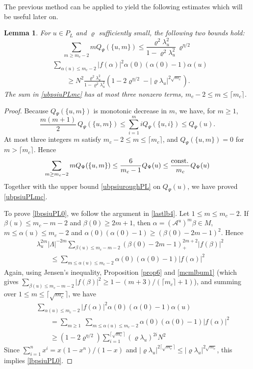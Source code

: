 \documentclass[11pt]{article}
\numberwithin{equation}{section}
\newcommand{\beq}{\begin{equation}}
\newcommand{\eeq}{\end{equation}}
\newcommand{\beqa}{\begin{eqnarray}}
\newcommand{\eeqa}{\end{eqnarray}}
\newcommand\const{{\rm const.\, }}
\newcommand\al{{\alpha}}
\newcommand\be{\beta}
\renewcommand\rho\varrho
\newtheorem{lem}{Lemma}[section]
\theoremstyle{definition}
\begin{document}
\bigskip 

 
The previous  method can be applied to yield the following estimates which will be useful later on. 
\begin{lem} For $u\in P_L$ and  $\rho$ sufficiently small, the following two bounds hold: 
\beq\label{ubpsiuPLmc}
	\sum_{m\geq m_c-2} m Q_\Psi(\{u,m\})\leq \frac{\rho^2\lambda_u^2}{1-\rho^2\lambda_u^2}\,\rho^{\eta/2}
\eeq
\beq\label{lbpsiuPL0}
\begin{split}
	&\sum_{\al(u)\leq m_c-2}|f(\al)|^2\al(0)(\al(0)-1)\al(u)\\
	&\qquad\geq N^2\frac{\rho^2\lambda_u^2}{1-\rho^2\lambda_u^2}(1-2\rho^{\eta/2}-|\rho\lambda_u|^{2\sqrt{m_c}}).
\end{split}
\eeq
The sum in \eqref{ubpsiuPLmc} has at most three nonzero terms, $m_c-2\leq m\leq\lceil m_c\rceil$. 
 \end{lem}
 \begin{proof}
Because $Q_\Psi(\{u,m\}) $ is monotonic decrease in $m$, we have, for $m\geq1$,
\[
\frac{m(m+1)}2\,Q_\Psi(\{u,m\})\leq\sum_{i=1}^m iQ_\Psi(\{u,i\})\leq Q_\Psi(u) .
\]
At most three integers $m$ satisfy $m_c-2\leq m\leq\lceil m_c\rceil$, and $Q_\Psi(\{u,m\})=0$ for $m>\lceil m_c\rceil$. Hence 
 \beq
 \sum_{m\geq m_c-2} m Q_\Psi(\{u,m\})\leq \frac{6} {m_c-1} Q_{\Psi}(u)\leq  \frac{\const} {m_c}Q_{\Psi}(u)
 \eeq
Together with the upper bound \eqref{ubpsiuroughPL} on $Q_\Psi(u)$, we have proved \eqref{ubpsiuPLmc}.


To prove \eqref{lbpsiuPL0}, we follow the argument in \eqref{lastlb4}. Let $1\leq m\leq m_{c}-2$. If $\be(u)\leq m_c-m-2$ and $\be(0)\geq 2m+1$, then $\al=(\mathcal A^{u})^m\be\in M$, $m\leq\al(u)\leq m_c-2$ and $\al(0)(\al(0)-1)\geq(\be(0)-2m-1)^2$. Hence 
\begin{align*}
&\lambda_u^{2m}|\Lambda|^{-2m}\sum_{\be(u)\leq m_c-m-2}
\left(\be(0)-2m-1\right)_+^{2m+2}|f(\be)|^2 \\
&\qquad\le \sum_{m\leq \al(u)\leq m_c-2} \al(0)(\al(0)-1)|f(\al)|^2
\end{align*}
Again, using Jensen's inequality, Proposition  \ref{prop6} and \eqref{mcmlbum1} (which gives $\sum_{\be(u)\leq m_c-m-2}|f(\be)|^2\geq 1-(m+3)/(\lceil m_c\rceil+1)$), and summing over $1\leq m\leq\lceil\sqrt{m_c}\rceil$, we have 
\beqa\nonumber
&&\sum_{\al(u)\leq m_c-2}|f(\al)|^2\al(0)(\al(0)-1)\al(u)\\\nonumber
&&\qquad=\sum_{m\geq1}\;\sum_{m\leq\al(u)\leq m_c-2} \al(0)(\al(0)-1)|f(\al)|^2\\
&&\qquad\geq (1-2\rho^{\eta/2})  \sum_{i=1}^{\lceil\sqrt{m_c}\rceil}(\rho\lambda_u)^{2i}N^2
\eeqa
Since $\sum_{i=1}^{n}x^i=x(1-x^n)/(1-x)$ and $|\rho\lambda_u|^{2\lceil\sqrt{m_c}\rceil}\leq|\rho\lambda_u|^{2\sqrt{m_c}}$, this implies \eqref{lbpsiuPL0}.
 \end{proof}
\end{document}
